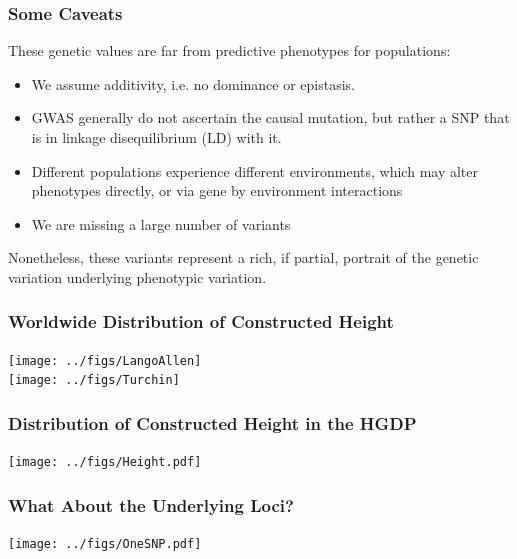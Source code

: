 \documentclass{beamer}
\begin{document}
\begin{frame}
	\frametitle{Some Caveats}
These genetic values are far from predictive phenotypes for populations:
	\begin{itemize}
		\item We assume  additivity, i.e. no dominance or epistasis. 
		\item GWAS generally do not ascertain the causal mutation, but rather a SNP that is in linkage disequilibrium (LD) with it.
		\item Different populations experience different environments, which may alter phenotypes directly, or via gene by environment interactions
		\item We are missing a large number of variants
	\end{itemize}
	Nonetheless, these variants represent a rich, if partial, portrait of the genetic variation underlying phenotypic variation.
\end{frame}

\begin{frame}
	\frametitle{Worldwide Distribution of Constructed Height}
		\texttt{[image: ../figs/LangoAllen]} \\
		\texttt{[image: ../figs/Turchin]} \\
\end{frame}

\begin{frame}
	\frametitle{Distribution of Constructed Height in the HGDP}
	\texttt{[image: ../figs/Height.pdf]}
\end{frame}

\begin{frame}
	\frametitle{What About the Underlying Loci?}
	\texttt{[image: ../figs/OneSNP.pdf]}
\end{frame}
\end{document}
